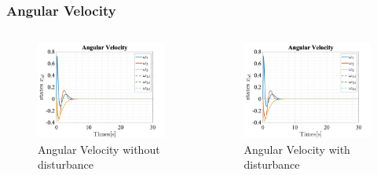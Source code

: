 \documentclass{beamer}
\begin{document}
\begin{frame}
    \frametitle{Angular Velocity}


    \begin{columns}

        \begin{figure}[h]
            \centering
            \includegraphics[width=1\textwidth]{Angular_Velociy_T_LQR_Dist.jpg}
            \caption{Angular Velocity without disturbance}
        \end{figure}

        \begin{figure}[h]
            \centering
            \includegraphics[width=1\textwidth]{Angular_Velociy_T_LQR_Dist.jpg}
            \caption{Angular Velocity with disturbance}
        \end{figure}
    \end{columns}

\end{frame}
\end{document}
